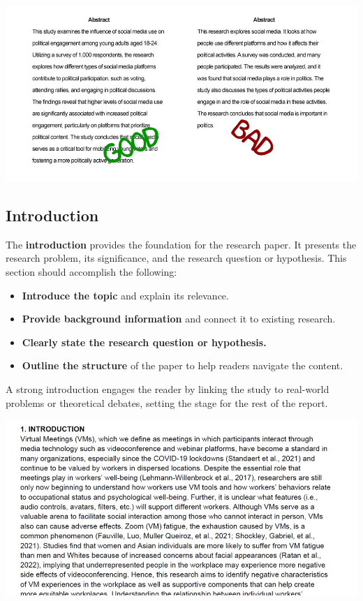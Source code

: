 \documentclass[
]{book}
\providecommand{\tightlist}{%
  \setlength{\itemsep}{0pt}\setlength{\parskip}{0pt}}
\begin{document}
\includegraphics[width=1\linewidth,height=\textheight,keepaspectratio]{images/fig081.jpg}

\subsection*{Introduction}\label{introduction}

The \textbf{introduction} provides the foundation for the research paper. It presents the research problem, its significance, and the research question or hypothesis. This section should accomplish the following:

\begin{itemize}
\tightlist
\item
  \textbf{Introduce the topic} and explain its relevance.
\item
  \textbf{Provide background information} and connect it to existing research.
\item
  \textbf{Clearly state the research question or hypothesis.}
\item
  \textbf{Outline the structure} of the paper to help readers navigate the content.
\end{itemize}

A strong introduction engages the reader by linking the study to real-world problems or theoretical debates, setting the stage for the rest of the report.

\includegraphics[width=1\linewidth,height=\textheight,keepaspectratio]{images/fig082.jpg}
\end{document}
